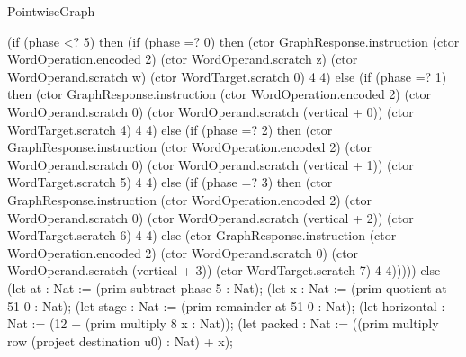 \begin{lexlean}{PointwiseGraph}
\begin{semanticmodule}
{      (if (phase <? 5) then (if (phase =? 0) then (ctor GraphResponse.instruction (ctor WordOperation.encoded 2) (ctor WordOperand.scratch z) (ctor WordOperand.scratch w) (ctor WordTarget.scratch 0) 4 4) else (if (phase =? 1) then (ctor GraphResponse.instruction (ctor WordOperation.encoded 2) (ctor WordOperand.scratch 0) (ctor WordOperand.scratch (vertical + 0)) (ctor WordTarget.scratch 4) 4 4) else (if (phase =? 2) then (ctor GraphResponse.instruction (ctor WordOperation.encoded 2) (ctor WordOperand.scratch 0) (ctor WordOperand.scratch (vertical + 1)) (ctor WordTarget.scratch 5) 4 4) else (if (phase =? 3) then (ctor GraphResponse.instruction (ctor WordOperation.encoded 2) (ctor WordOperand.scratch 0) (ctor WordOperand.scratch (vertical + 2)) (ctor WordTarget.scratch 6) 4 4) else (ctor GraphResponse.instruction (ctor WordOperation.encoded 2) (ctor WordOperand.scratch 0) (ctor WordOperand.scratch (vertical + 3)) (ctor WordTarget.scratch 7) 4 4))))) else (let at : Nat := (prim subtract phase 5 : Nat);
      (let x : Nat := (prim quotient at 51 0 : Nat);
      (let stage : Nat := (prim remainder at 51 0 : Nat);
      (let horizontal : Nat := (12 + (prim multiply 8 x : Nat));
      (let packed : Nat := ((prim multiply row (project destination u0) : Nat) + x);
}
\end{semanticmodule}
\end{lexlean}
